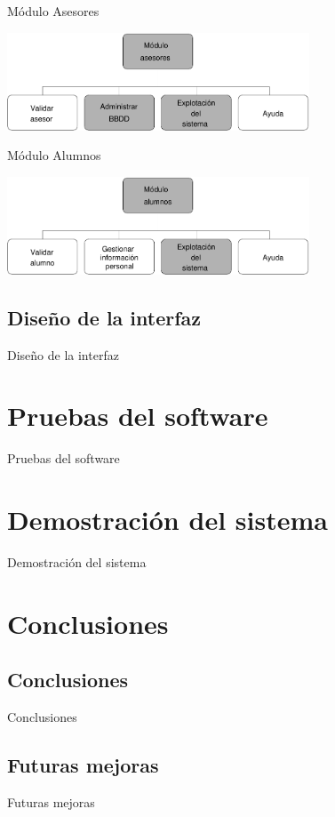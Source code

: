 \documentclass[10pt, hyperref={pdfpagelabels=false}]{beamer}
\begin{document}
      \begin{frame}{Módulo Asesores}
        \begin{center}
          \includegraphics[width=9cm]{Diagramas/moduloAsesores}
        \end{center}
      \end{frame}

      \begin{frame}{Módulo Alumnos}
        \begin{center}
          \includegraphics[width=9cm]{Diagramas/moduloAlumnos}
        \end{center}
      \end{frame}

    \subsection{Diseño de la interfaz}
      \begin{frame}{Diseño de la interfaz}

      \end{frame}


  \section{Pruebas del software}
    \begin{frame}{Pruebas del software}

    \end{frame}


  \section{Demostración del sistema}
    \begin{frame}{Demostración del sistema}

    \end{frame}


  \section{Conclusiones}
    \subsection{Conclusiones}
      \begin{frame}{Conclusiones}

      \end{frame}

    \subsection{Futuras mejoras}
      \begin{frame}{Futuras mejoras}

      \end{frame}
\end{document}
